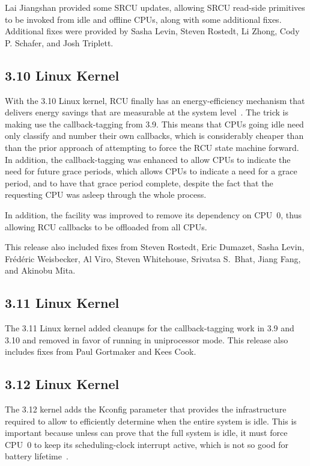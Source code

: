 Lai Jiangshan provided some SRCU updates, allowing SRCU read-side primitives
to be invoked from idle and offline CPUs, along with some additional
fixes.
Additional fixes were provided by Sasha Levin, Steven Rostedt,
Li Zhong, Cody P. Schafer, and Josh Triplett.

\subsection{3.10 Linux Kernel}

With the 3.10 Linux kernel, RCU finally has an energy-efficiency mechanism
that delivers energy savings that are measurable at the system
level~\cite{PaulMcKenney2013AMPenergyHOTPAR}.
The trick is making  use the callback-tagging from
3.9.
This means that CPUs going idle need only classify and number their own
callbacks, which is considerably cheaper than than the prior approach
of attempting to force the RCU state machine forward.
In addition, the callback-tagging was enhanced to allow CPUs to indicate
the need for future grace periods, which allows CPUs to indicate a need
for a grace period, and to have that grace period complete, despite the
fact that the requesting CPU was asleep through the whole process.

In addition, the  facility was improved to
remove its dependency on CPU~0, thus allowing RCU callbacks to be offloaded
from all CPUs.

This release also included fixes from Steven Rostedt, Eric Dumazet,
Sasha Levin, Fr\'ed\'eric Weisbecker, Al Viro, Steven Whitehouse,
Srivatsa S.~Bhat, Jiang Fang, and Akinobu Mita.

\subsection{3.11 Linux Kernel}

The 3.11 Linux kernel added cleanups for the callback-tagging work
in 3.9 and 3.10 and removed  in favor of running
 in uniprocessor mode.
This release also includes fixes from Paul Gortmaker and Kees Cook.

\subsection{3.12 Linux Kernel}

The 3.12 kernel adds the  Kconfig
parameter that provides the infrastructure required to allow
 to efficiently determine when the entire
system is idle.
This is important because unless  can prove
that the full system is idle, it must force CPU~0 to keep its
scheduling-clock interrupt active, which is not so good for battery
lifetime~\cite{JonathanCorbet2013SYSIDLE}.

